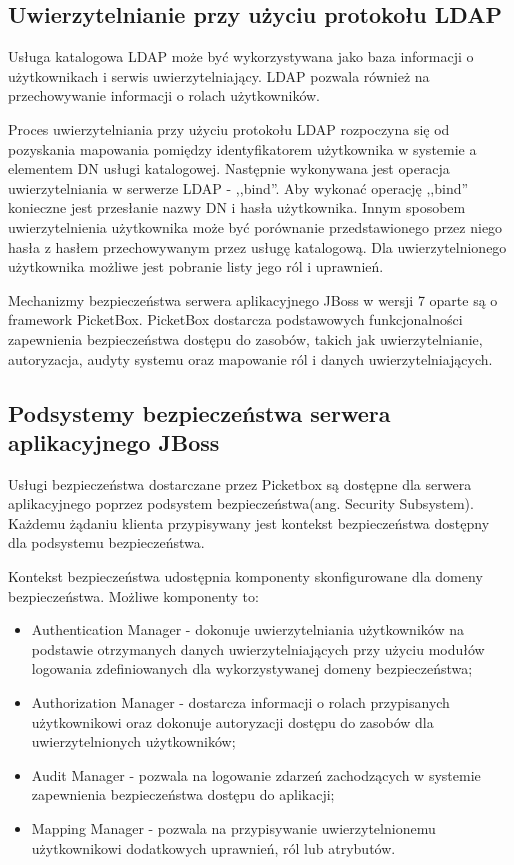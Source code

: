 	\subsection{Uwierzytelnianie przy użyciu protokołu LDAP}

		Usługa katalogowa LDAP może być wykorzystywana jako baza informacji o użytkownikach i serwis uwierzytelniający. LDAP pozwala również na przechowywanie informacji o rolach użytkowników. 

		Proces uwierzytelniania przy użyciu protokołu LDAP rozpoczyna się od pozyskania mapowania pomiędzy identyfikatorem użytkownika w systemie a elementem DN usługi katalogowej. Następnie wykonywana jest operacja uwierzytelniania w serwerze LDAP - ,,bind''. Aby wykonać operację ,,bind'' konieczne jest przesłanie nazwy DN i hasła użytkownika.  Innym sposobem uwierzytelnienia użytkownika może być porównanie przedstawionego przez niego hasła z hasłem przechowywanym przez usługę katalogową. Dla uwierzytelnionego użytkownika możliwe jest pobranie listy jego ról i uprawnień.


\label{sec:jboss}

	Mechanizmy bezpieczeństwa serwera aplikacyjnego JBoss w wersji 7 oparte są o framework PicketBox. PicketBox dostarcza podstawowych funkcjonalności zapewnienia bezpieczeństwa dostępu do zasobów, takich jak uwierzytelnianie, autoryzacja, audyty systemu oraz mapowanie ról i danych uwierzytelniających. 

	\subsection{Podsystemy bezpieczeństwa serwera aplikacyjnego JBoss}

		Usługi bezpieczeństwa dostarczane przez Picketbox są dostępne dla serwera aplikacyjnego poprzez podsystem bezpieczeństwa(ang. Security Subsystem). Każdemu żądaniu klienta przypisywany jest kontekst bezpieczeństwa dostępny dla podsystemu bezpieczeństwa\cite{Lofthouse12}. 

		Kontekst bezpieczeństwa udostępnia komponenty skonfigurowane dla domeny bezpieczeństwa. Możliwe komponenty to:

		\begin{itemize}
			\item Authentication Manager - dokonuje uwierzytelniania użytkowników na podstawie otrzymanych danych uwierzytelniających przy użyciu modułów logowania zdefiniowanych dla wykorzystywanej domeny bezpieczeństwa;
			\item Authorization Manager - dostarcza informacji o rolach przypisanych użytkownikowi oraz dokonuje autoryzacji dostępu do zasobów dla uwierzytelnionych użytkowników;
			\item Audit Manager - pozwala na logowanie zdarzeń zachodzących w systemie zapewnienia bezpieczeństwa dostępu do aplikacji;
			\item Mapping Manager - pozwala na przypisywanie uwierzytelnionemu użytkownikowi dodatkowych uprawnień, ról lub atrybutów.
		\end{itemize}

